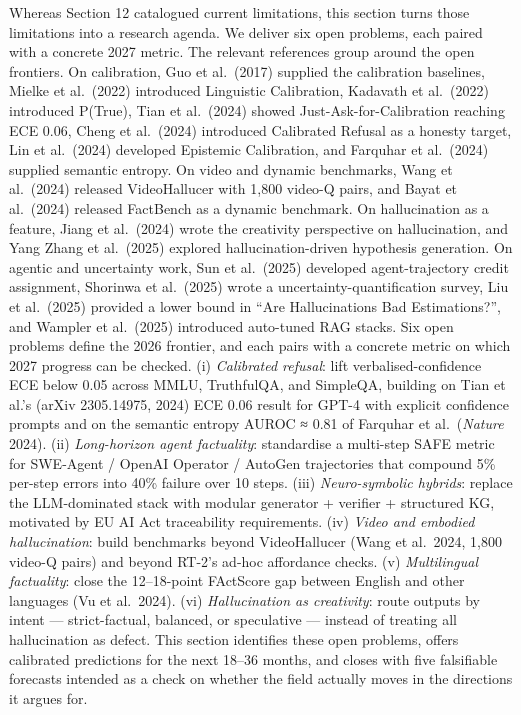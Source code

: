 \documentclass{article}
\begin{document}
Whereas Section 12 catalogued current limitations, this section turns those limitations into a research agenda. We deliver six open problems, each paired with a concrete 2027 metric. The relevant references group around the open frontiers. On calibration, Guo et al.~(2017) supplied the calibration baselines, Mielke et al.~(2022) introduced Linguistic Calibration, Kadavath et al.~(2022) introduced P(True), Tian et al.~(2024) showed Just-Ask-for-Calibration reaching ECE 0.06, Cheng et al.~(2024) introduced Calibrated Refusal as a honesty target, Lin et al.~(2024) developed Epistemic Calibration, and Farquhar et al.~(2024) supplied semantic entropy. On video and dynamic benchmarks, Wang et al.~(2024) released VideoHallucer with 1,800 video-Q pairs, and Bayat et al.~(2024) released FactBench as a dynamic benchmark. On hallucination as a feature, Jiang et al.~(2024) wrote the creativity perspective on hallucination, and Yang Zhang et al.~(2025) explored hallucination-driven hypothesis generation. On agentic and uncertainty work, Sun et al.~(2025) developed agent-trajectory credit assignment, Shorinwa et al.~(2025) wrote a uncertainty-quantification survey, Liu et al.~(2025) provided a lower bound in ``Are Hallucinations Bad Estimations?'', and Wampler et al.~(2025) introduced auto-tuned RAG stacks. Six open problems define the 2026 frontier, and each pairs with a concrete metric on which 2027 progress can be checked. (i) \emph{Calibrated refusal}: lift verbalised-confidence ECE below 0.05 across MMLU, TruthfulQA, and SimpleQA, building on Tian et al.'s (arXiv 2305.14975, 2024) ECE 0.06 result for GPT-4 with explicit confidence prompts and on the semantic entropy AUROC ≈ 0.81 of Farquhar et al.~(\emph{Nature} 2024). (ii) \emph{Long-horizon agent factuality}: standardise a multi-step SAFE metric for SWE-Agent / OpenAI Operator / AutoGen trajectories that compound 5\% per-step errors into 40\% failure over 10 steps. (iii) \emph{Neuro-symbolic hybrids}: replace the LLM-dominated stack with modular generator + verifier + structured KG, motivated by EU AI Act traceability requirements. (iv) \emph{Video and embodied hallucination}: build benchmarks beyond VideoHallucer (Wang et al.~2024, 1,800 video-Q pairs) and beyond RT-2's ad-hoc affordance checks. (v) \emph{Multilingual factuality}: close the 12--18-point FActScore gap between English and other languages (Vu et al.~2024). (vi) \emph{Hallucination as creativity}: route outputs by intent --- strict-factual, balanced, or speculative --- instead of treating all hallucination as defect. This section identifies these open problems, offers calibrated predictions for the next 18--36 months, and closes with five falsifiable forecasts intended as a check on whether the field actually moves in the directions it argues for.
\end{document}
